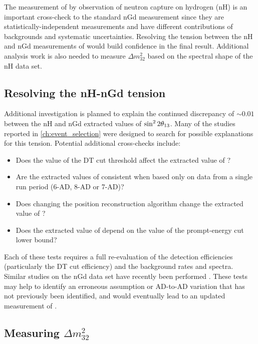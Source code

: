 The measurement of \thetaot{} by observation of neutron capture on hydrogen (nH)
is an important cross-check to the standard nGd measurement
since they are statistically-independent measurements and
have different contributions of backgrounds and systematic uncertainties.
Resolving the tension between the nH and nGd measurements of \thetaot{}
would build confidence in the final result.
Additional analysis work is also needed to measure $\Delta m^2_{32}$
based on the spectral shape of the nH data set.

\subsection{Resolving the nH-nGd tension}
\label{subsec:tension}

Additional investigation is planned to explain the continued discrepancy
of ${\sim}0.01$ between the nH and nGd extracted values of $\sin^22\theta_{13}$.
Many of the studies reported in \cref{ch:event_selection}
were designed to search for possible explanations for this tension.
Potential additional cross-checks include:
\begin{itemize}
    \item Does the value of the DT cut threshold affect the extracted value of
        \thetaot{}?
    \item Are the extracted values of \thetaot{} consistent when
        based only on data from a single run period (6-AD, 8-AD or 7-AD)?
    \item Does changing the position reconstruction algorithm
        change the extracted value of \thetaot{}?
    \item Does the extracted value of \thetaot{} depend on
        the value of the prompt-energy cut lower bound?
\end{itemize}
Each of these tests requires a full re-evaluation
of the detection efficiencies (particularly the DT cut efficiency)
and the background rates and spectra.
Similar studies on the nGd data set have recently
been performed \cite{matt_thesis}.
These tests may help to identify an erroneous assumption
or AD-to-AD variation that has not previously been identified,
and would eventually lead to an updated measurement of \thetaot{}.


\subsection{Measuring \texorpdfstring{$\Delta m^2_{32}$}{the 3,2 mass splitting}}
\label{subsec:rateplusshape}

